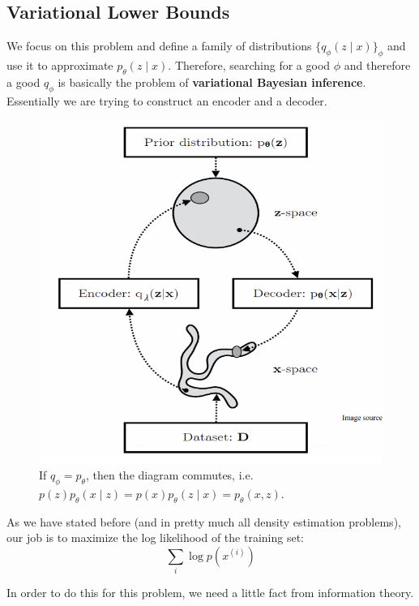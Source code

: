 \subsection{Variational Lower Bounds} 

  We focus on this problem and define a family of distributions $\{q_\phi (z \mid x)\}_\phi$ and use it to approximate $p_\theta (z \mid x)$. Therefore, searching for a good $\phi$ and therefore a good $q_\phi$ is basically the problem of \textbf{variational Bayesian inference}. Essentially we are trying to construct an encoder and a decoder.

  \begin{figure}[H]
    \centering 
    \includegraphics[scale=0.4]{img/VAE_framework.png}
    \caption{If $q_{\phi} = p_{\theta}$, then the diagram commutes, i.e. $p(z) p_{\theta}(x \mid z) = p(x) p_{\theta}(z \mid x) = p_{\theta} (x, z)$.} 
    \label{fig:vae_framework}
  \end{figure}

  As we have stated before (and in pretty much all density estimation problems), our job is to maximize the log likelihood of the training set: 
  \begin{equation}
    \sum_{i} \log p(x^{(i)})
  \end{equation}

  In order to do this for this problem, we need a little fact from information theory. 

